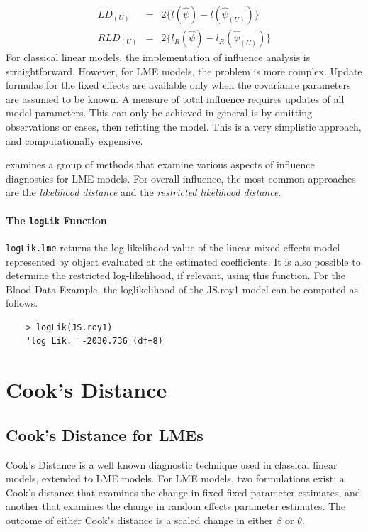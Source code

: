 \documentclass[12pt, a4paper]{report}
\theoremstyle{plain}
\theoremstyle{definition}
\theoremstyle{remark}
\begin{document}
\begin{eqnarray}
LD_{(U)} &=& 2\{l(\hat{\psi}) - l( \hat{\psi}_{(U)}) \}\\
RLD_{(U)} &=& 2\{l_{R}(\hat{\psi}) - l_{R}(\hat{\psi}_{(U)})\}
\end{eqnarray}
For classical linear models, the implementation of influence analysis is straightforward.
However, for LME models, the problem is more complex. Update formulas for the fixed effects are available only when the covariance parameters are assumed to be known. A measure of total influence requires updates of all model parameters. This can only be achieved in general is by omitting observations or cases, then refitting the model. This is a very simplistic approach, and computationally expensive.

\citet{west} examines a group of methods that examine various aspects of influence diagnostics for LME models.
For overall influence, the most common approaches are the \textit{likelihood distance} and the \textit{restricted likelihood distance}.

\subsubsection{The \texttt{logLik} Function}
\texttt{logLik.lme} returns the log-likelihood value of the linear mixed-effects model represented by object evaluated at the estimated coefficients. It is also possible to determine the restricted log-likelihood, if relevant, using this function. For the Blood Data Example,  the loglikelihood of the JS.roy1 model can be computed as follows.
\begin{framed}
	\begin{verbatim}
	> logLik(JS.roy1)
	'log Lik.' -2030.736 (df=8)
	\end{verbatim}
\end{framed}
	
\chapter{Cook's Distance}

		\section{Cook's Distance for LMEs} %
		
		
		Cook's Distance is a well known diagnostic technique used in classical linear models, extended to LME models.  For LME models, two formulations exist; a Cook's distance that examines the change in fixed fixed parameter estimates, and another that examines the change in random effects parameter estimates. The outcome of either Cook's distance is a scaled change in either $\beta$ or $\theta$.
		
\end{document}

